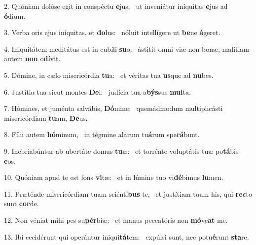2. Quóniam dolóse egit in conspéctu \textbf{e}jus: \ast\  ut inveniátur iníquitas \textbf{e}jus ad \textbf{ó}dium.\

3. Verba oris ejus iníquitas, et \textbf{do}lus: \ast\  nóluit intellígere ut \textbf{be}ne \textbf{á}geret.\

4. Iniquitátem meditátus est in cubíli \textbf{su}o: \ast\  ástitit omni viæ non bonæ, malítiam autem \textbf{non} o\textbf{dí}vit.\

5. Dómine, in cælo misericórdia \textbf{tu}a: \ast\  et véritas tua \textbf{us}que ad \textbf{nu}bes.\

6. Justítia tua sicut montes \textbf{De}i: \ast\  judícia tua a\textbf{býs}sus \textbf{mul}ta.\

7. Hómines, et juménta salvábis, \textbf{Dó}mine: \ast\  quemádmodum multiplicásti misericórdiam \textbf{tu}am, \textbf{De}us,\

8. Fílii autem \textbf{hó}minum, \ast\  in tégmine alárum tu\textbf{á}rum spe\textbf{rá}bunt.\

9. Inebriabúntur ab ubertáte domus \textbf{tu}æ: \ast\  et torrénte voluptátis tuæ po\textbf{tá}bis \textbf{e}os.\

10. Quóniam apud te est fons \textbf{vi}tæ: \ast\  et in lúmine tuo vi\textbf{dé}bimus \textbf{lu}men.\

11. Præténde misericórdiam tuam sciénti\textbf{bus} te, \ast\  et justítiam tuam his, qui \textbf{rec}to sunt \textbf{cor}de.\

12. Non véniat mihi pes su\textbf{pér}biæ: \ast\  et manus peccatóris non \textbf{mó}ve\textbf{at} me.\

13. Ibi cecidérunt qui operántur iniqui\textbf{tá}tem: \ast\  expúlsi sunt, nec potu\textbf{é}runt \textbf{sta}re.\


